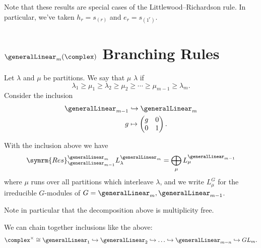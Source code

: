 \documentclass[fleqn]{NotesClass}
\newcommand{\isomorphic}{\cong}
\newcommand{\Res}{\symrm{Res}}
\begin{document}
    Note that these results are special cases of the Littlewood--Richardson rule.
    In particular, we've taken \(h_r = s_{(r)}\) and \(e_r = s_{(1^r)}\).
    
    \section{\texorpdfstring{\(\generalLinear_m(\complex)\)}{GLm} Branching Rules}
    Let \(\lambda\) and \(\mu\) be partitions.
    We say that \(\mu\)  \(\lambda\) if
    \begin{equation}
        \lambda_1 \ge \mu_1 \ge \lambda_2 \ge \mu_2 \ge \dotsb \ge \mu_{m-1} \ge \lambda_m.
    \end{equation}
    Consider the inclusion
    \begin{equation}
        \begin{aligned}
            \generalLinear_{m-1} &\hookrightarrow \generalLinear_m\\
            g & \mapsto
            \begin{pmatrix}
                g & 0\\
                0 & 1
            \end{pmatrix}
            .
        \end{aligned}
    \end{equation}
    
    \begin{prp}{}{}
        With the inclusion above we have
        \begin{equation}
            \Res^{\generalLinear_m}_{\generalLinear_{m-1}} L_\lambda^{\generalLinear_m} = \bigoplus_\mu L_\mu^{\generalLinear_{m-1}}
        \end{equation}
        where \(\mu\) runs over all partitions which interleave \(\lambda\), and we write \(L_\mu^G\) for the irreducible \(G\)-modules of \(G = \generalLinear_m, \generalLinear_{m-1}\).
    \end{prp}
    
    Note in particular that the decomposition above is multiplicity free.
    
    We can chain together inclusions like the above:
    \begin{equation}
        \complex^{\times} \isomorphic \generalLinear_1 \hookrightarrow \generalLinear_2 \hookrightarrow \dotso \hookrightarrow\generalLinear_{m-n} \hookrightarrow GL_m.
    \end{equation}
    
\end{document}
